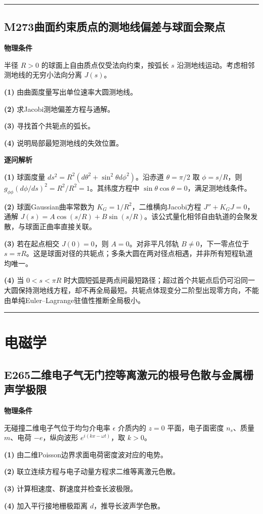 \documentclass[UTF8,a4paper,11pt,oneside,openany]{ctexbook}
\begin{document}
\par\bigskip\hrule\bigskip
\section*{M273\quad 曲面约束质点的测地线偏差与球面会聚点}
\textbf{物理条件}\par 半径 \(R>0\) 的球面上自由质点仅受法向约束，按弧长 \(s\) 沿测地线运动。考虑相邻测地线的无穷小法向分离 \(J(s)\)。
\par\noindent\textbf{(1)} 由曲面度量写出单位速率大圆测地线。
\par\noindent\textbf{(2)} 求Jacobi测地偏差方程与通解。
\par\noindent\textbf{(3)} 寻找首个共轭点的弧长。
\par\noindent\textbf{(4)} 说明局部最短测地线的失效位置。

\par\medskip\noindent\textbf{逐问解析}
\par\noindent\textbf{(1)} 球面度量 \(ds^2=R^2(d\theta^2+\sin^2\theta d\phi^2)\)。沿赤道 \(\theta=\pi/2\) 取 \(\phi=s/R\)，则 \(g_{\phi\phi}(d\phi/ds)^2=R^2/R^2=1\)。其纬度方程中 \(\sin\theta\cos\theta=0\)，满足测地线条件。
\par\noindent\textbf{(2)} 球面Gaussian曲率常数为 \(K_G=1/R^2\)，二维横向Jacobi方程 \(J''+K_GJ=0\)，通解 \(J(s)=A\cos(s/R)+B\sin(s/R)\)。该公式量化相邻自由轨道的会聚发散，与球面正曲率直接关联。
\par\noindent\textbf{(3)} 若在起点相交 \(J(0)=0\)，则 \(A=0\)。对非平凡邻轨 \(B\ne0\)，下一零点位于 \(s=\pi R\)。这是球面对径的共轭点；多条大圆在两对径点相遇，并非所有短程轨道均唯一。
\par\noindent\textbf{(4)} 当 \(0<s<\pi R\) 时大圆短弧是两点间最短路径；超过首个共轭点后仍可沿同一大圆保持测地线方程，却不再全局最短。共轭点体现变分二阶型出现零方向，不能由单纯Euler–Lagrange驻值性推断全局极小。

\par\bigskip\hrule\bigskip
\chapter{电磁学}
\section*{E265\quad 二维电子气无门控等离激元的根号色散与金属栅声学极限}
\textbf{物理条件}\par 无碰撞二维电子气位于均匀介电率 \(\epsilon\) 介质内的 \(z=0\) 平面，电子面密度 \(n_s\)、质量 \(m\)、电荷 \(-e\)，纵向波形 \(e^{i(kx-\omega t)}\)，取 \(k>0\)。
\par\noindent\textbf{(1)} 由二维Poisson边界求面电荷密度波对应的电势。
\par\noindent\textbf{(2)} 联立连续方程与电子动量方程求二维等离激元色散。
\par\noindent\textbf{(3)} 计算相速度、群速度并检查长波极限。
\par\noindent\textbf{(4)} 加入平行接地栅极距离 \(d\)，推导长波声学色散。
\end{document}
